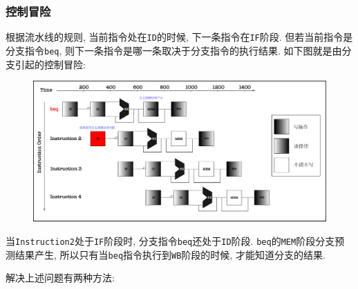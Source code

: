 \subsubsection{控制冒险}
根据流水线的规则, 当前指令处在\verb|ID|的时候, 下一条指令在\verb|IF|阶段. 但若当前指令是分支指令\verb|beq|, 则下一条指令是哪一条取决于分支指令的执行结果. 如下图就是由分支引起的控制冒险:
\begin{figure}[H]
\centering
\includegraphics[scale=.4]{img/figure46.pdf}
\end{figure}
当\verb|Instruction2|处于\verb|IF|阶段时, 分支指令\verb|beq|还处于\verb|ID|阶段. \verb|beq|的\verb|MEM|阶段分支预测结果产生, 所以只有当\verb|beq|指令执行到\verb|WB|阶段的时候, 才能知道分支的结果. \par 解决上述问题有两种方法:

